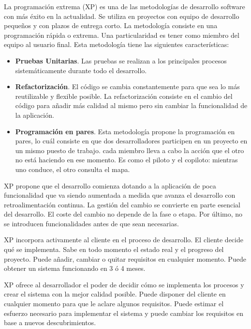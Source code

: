       La programación extrema (XP) es una de las metodologías de desarrollo software con más éxito en la actualidad. Se utiliza en proyectos con equipo de desarrollo pequeños y con plazos de entrega corto. La metodología consiste en una programación rápida o extrema. Una particularidad es tener como miembro del equipo al usuario final. Esta metodología tiene las siguientes características:

      \begin{itemize}
        \item {\bf Pruebas Unitarias}. Las pruebas se realizan a los principales procesos sistemáticamente durante todo el desarrollo.
        \item {\bf Refactorización}. El código se cambia constantemente para que sea lo más reutilizable y flexible posible. La refactorización consiste en el cambio del código para añadir más calidad al mismo pero sin cambiar la funcionalidad de la aplicación.
        \item {\bf Programación en pares}. Esta metodología propone la programación en pares, lo cuál consiste en que dos desarrolladores participen en un proyecto en un mismo puesto de trabajo. cada miembro lleva a cabo la acción que el otro no está haciendo en ese momento. Es como el piloto y el copiloto: mientras uno conduce, el otro consulta el mapa.
      \end{itemize}

      XP propone que el desarrollo comienza dotando a la aplicación de poca funcionalidad que va siendo aumentada a medida que avanza el desarrollo con retroalimentación continua. La gestión del cambio se convierte en parte esencial del desarrollo. El coste del cambio no depende de la fase o etapa. Por último, no se introducen funcionalidades antes de que sean necesarias.

      XP incorpora activamente al cliente en el proceso de desarrollo. El cliente decide qué se implementa. Sabe en todo momento el estado real y el progreso del proyecto. Puede añadir, cambiar o quitar requisitos en cualquier momento. Puede obtener un sistema funcionando en 3 ó 4 meses.

      XP ofrece al desarrollador el poder de decidir cómo se implementa los procesos y crear el sistema con la mejor calidad posible. Puede disponer del cliente en cualquier momento para que le aclare algunos requisitos. Puede estimar el esfuerzo necesario para implementar el sistema y puede cambiar los requisitos en base a nuevos descubrimientos.

